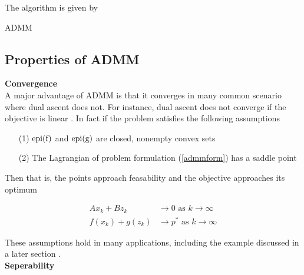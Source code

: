 \documentclass[11pt]{article}
\begin{document}
The algorithm is given by  \\

\begin{algorithm}[H]
    \caption{ADMM}

    \SetAlgoNoLine

\end{algorithm}

\subsection{Properties of ADMM}

\quad \textbf{Convergence}\\
A major advantage of ADMM is that it converges in many common scenario
where dual ascent does not. For instance, dual ascent does not converge if the objective is 
linear \cite{boydistributed}. In fact if the problem satisfies the following 
assumptions
\begin{itemize}
    \item[(1)] $\rm{epi}(f)$ and $\rm{epi}(g)$ are closed, nonempty convex sets 
    \item[(2)] The Lagrangian of problem formulation (\ref{admmform}) has a saddle point  
\end{itemize}
Then 
that is, the points approach feasability and the objective approaches its optimum

\begin{equation*}
\begin{aligned}
    Ax_k + Bz_k &\rightarrow 0 \text{ as } k \rightarrow \infty \\
    f(x_k) + g(z_k) &\rightarrow p^* \text{ as } k \rightarrow \infty
\end{aligned}
\end{equation*}

These assumptions hold in many applications, including the example
discussed in a later section  \cite{boydistributed}. \\

\textbf{Seperability}
\end{document}
